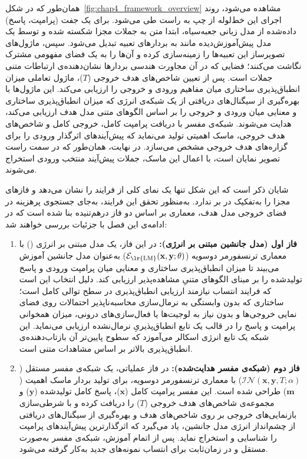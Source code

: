 همان‌طور که در شکل~\ref{fig:chap4_framework_overview} مشاهده می‌شود، روند اجرای این خط‌لوله از چپ به راست طی می‌شود. برای یک جفت (پرامپت، پاسخ) داده‌شده از مدل زبانی جعبه‌سیاه، ابتدا متن به جملات مجزا شکسته شده و توسط یک مدل پیش‌آموزش‌دیده مانند  به بردارهای تعبیه تبدیل می‌شود. سپس، ماژول‌های تصویرساز این تعبیه‌ها را زمینه‌سازی کرده و آن‌ها را به یک فضای مفهومی مشترک نگاشت می‌کنند؛ فضایی که در آن مجاورت هندسی بردارها نشان‌دهنده‌ی ارتباطات متنی جملات است. پس از تعیین شاخص‌های هدف خروجی ($T$)، ماژول تعاملی میزان انطباق‌پذیری ساختاری میان مفاهیم ورودی و خروجی را ارزیابی می‌کند. این ماژول‌ها با بهره‌گیری از سیگنال‌های دریافتی از یک شبکه‌ی انرژی که میزان انطباق‌پذیری ساختاری و معنایی میان ورودی و خروجی را بر اساس الگوهای متنی مدل هدف ارزیابی می‌کند، هدایت می‌شوند. شبکه‌ی مفسر با دریافت پرامپت کامل، خروجی کامل و شاخص‌های هدف خروجی، ماسک اهمیتی تولید می‌نماید که پیش‌آیندهای اثرگذار ورودی را برای گزاره‌های هدف خروجی مشخص می‌سازد. در نهایت، همان‌طور که در سمت راست تصویر نمایان است، با اعمال این ماسک، جملات پیش‌آیند منتخب ورودی استخراج می‌شوند.

شایان ذکر است که این شکل تنها یک نمای کلی از فرایند را نشان می‌دهد و فازهای مجزا را به‌تفکیک در بر ندارد. به‌منظور تحقق این فرایند، به‌جای جستجوی پرهزینه در فضای خروجی مدل هدف، معماری  بر اساس دو فاز درهم‌تنیده بنا شده است که در ادامه‌ی این فصل با جزئیات بررسی خواهند شد:

\begin{enumerate}
    \item \textbf{فاز اول (مدل جانشین مبتنی بر انرژی):} در این فاز، یک مدل مبتنی بر انرژی () با معماری ترنسفورمر دوسویه ($\mathcal{E}_{\text{\lr{LM}}}(\mathbf{x}, \mathbf{y}; \theta)$) به‌عنوان مدل جانشین آموزش می‌بیند تا میزان انطباق‌پذیری ساختاری و معنایی میان پرامپت ورودی و پاسخ تولیدشده را بر مبنای الگوهای متنیِ مشاهده‌پذیر ارزیابی کند. دلیل انتخاب  این است که فرایند انتساب نیازمند ارزیابی انطباق‌پذیری در سطح توالی کامل است؛ ساختاری که بدون وابستگی به نرمال‌سازی محاسبه‌ناپذیر احتمالات روی فضای نمایی خروجی‌ها و بدون نیاز به لوجیت‌ها یا فعال‌سازی‌های درونی، میزان همخوانی پرامپت و پاسخ را در قالب یک تابع انطباق‌پذیریِ نرمال‌نشده ارزیابی می‌نماید. این شبکه یک تابع انرژی اسکالر می‌آموزد که سطوح پایین‌تر آن بازتاب‌دهنده‌ی انطباق‌پذیری بالاتر بر اساس مشاهدات متنی است.
    
    \item \textbf{فاز دوم (شبکه‌ی مفسر هدایت‌شده):} در فاز عملیاتی، یک شبکه‌ی مفسر مستقل ($\mathcal{IN}(\mathbf{x}, \mathbf{y}, T; \alpha)$) با معماری ترنسفورمر دوسویه، برای تولید بردار ماسک اهمیت ($\mathbf{m}$) طراحی شده است. این مفسر پرامپت کامل ($\mathbf{x}$)، پاسخ کامل تولیدشده ($\mathbf{y}$) و مجموعه‌ی شاخص‌های هدف خروجی ($T$) را دریافت کرده و با شرطی‌سازی بازنمایی‌های خروجی بر روی شاخص‌های هدف و بهره‌گیری از سیگنال‌های دریافتی از چشم‌انداز انرژی مدل جانشین، یاد می‌گیرد که اثرگذارترین پیش‌آیندهای پرامپت را شناسایی و استخراج نماید. پس از اتمام آموزش، شبکه‌ی مفسر به‌صورت مستقل و در زمان‌ثابت برای انتساب نمونه‌های جدید به‌کار گرفته می‌شود.
\end{enumerate}

